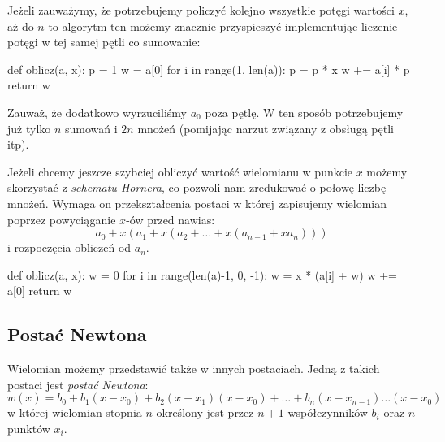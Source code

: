 \documentclass{pdfBooklets}
\begin{document}
Jeżeli zauważymy, że potrzebujemy policzyć kolejno wszystkie potęgi wartości $x$, aż do $n$ to algorytm ten możemy znacznie przyspieszyć implementując liczenie potęgi w tej samej pętli co sumowanie:
\begin{CodeFrame*}[python]{}
def oblicz(a, x):
    p = 1
    w = a[0]
    for i in range(1, len(a)):
        p = p * x
        w += a[i] * p
    return w
\end{CodeFrame*}
Zauważ, że dodatkowo wyrzuciliśmy $a_0$ poza pętlę. W ten sposób potrzebujemy już tylko $n$ sumowań i $2n$ mnożeń (pomijając narzut związany z obsługą pętli itp).

Jeżeli chcemy jeszcze szybciej obliczyć wartość wielomianu w punkcie $x$ możemy skorzystać z \emph{schematu Hornera}, co pozwoli nam zredukować o połowę liczbę mnożeń.
Wymaga on przekształcenia postaci w której zapisujemy wielomian poprzez powyciąganie $x$-ów przed nawias:
$$a_0 + x(a_1 + x(a_2 + \ldots + x(a_{n-1} + xa_n)))$$
i rozpoczęcia obliczeń od $a_n$.

\begin{CodeFrame*}[python]{}
def oblicz(a, x):
    w = 0
    for i in range(len(a)-1, 0, -1):
        w = x * (a[i] + w)
    w += a[0]
    return w
\end{CodeFrame*}

\subsection{Postać Newtona}

Wielomian możemy przedstawić także w innych postaciach. Jedną z takich postaci jest \emph{postać Newtona}:
$$w(x) = b_0 + b_1(x-x_0) + b_2(x-x_1)(x-x_0) + \ldots + b_n(x-x_{n-1})\ldots(x-x_0)$$
w której wielomian stopnia $n$ określony jest przez $n+1$ współczynników $b_i$ oraz $n$ punktów $x_i$.

\end{document}

